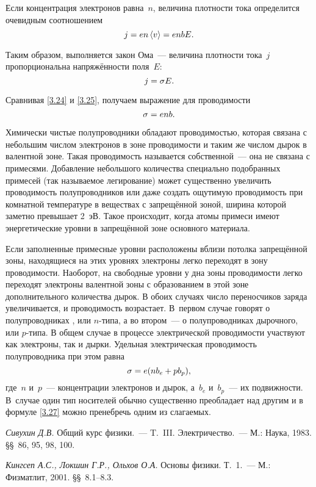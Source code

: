 Если концентрация электронов равна~$n$, величина плотности тока определится
очевидным соотношением
\begin{equation}
	\eqmark{3.24}
	j=en\average{v}=enbE.
\end{equation}

Таким образом, выполняется закон Ома~--- величина плотности тока~$j$
пропорциональна напряжённости поля~$E$:
\begin{equation}
	\eqmark{3.25}
	j=\sigma E.
\end{equation}

Сравнивая \eqref{3.24} и \eqref{3.25}, получаем выражение для проводимости
\begin{equation}
	\eqmark{3.26}
	\sigma=enb.
\end{equation}

Химически чистые полупроводники обладают проводимостью, которая связана с
небольшим числом электронов в зоне
проводимости и таким же числом дырок в валентной зоне. Такая проводимость
называется собственной~--- она не связана с примесями. Добавление небольшого
количества специально подобранных примесей (так называемое
легирование) может существенно увеличить проводимость полупроводников или даже
создать ощутимую проводимость при комнатной температуре в веществах с
запрещённой зоной, ширина которой заметно превышает 2~эВ. Такое происходит,
когда атомы примеси имеют энергетические уровни в запрещённой зоне основного
материала.

Если заполненные примесные уровни расположены вблизи потолка запрещённой зоны,
находящиеся на этих уровнях электроны легко переходят в зону проводимости.
Наоборот, на свободные уровни у дна зоны проводимости легко переходят электроны
валентной зоны с образованием в этой зоне дополнительного количества дырок. В
обоих случаях число переносчиков заряда увеличивается, и проводимость
возрастает. В~первом случае говорят о полупроводниках ,
или $n$-типа, а во втором~--- о  полупроводниках дырочного, или $p$-типа. В
общем случае в процессе электрической проводимости участвуют как электроны, так
и дырки. Удельная электрическая проводимость полупроводника при этом равна
\begin{equation}
	\eqmark{3.27}
	\sigma=e(nb_e+pb_p),
\end{equation}
где~$n$ и~$p$~--- концентрации электронов и дырок, а~$b_e$ и~$b_p$~--- их
подвижности. В~случае  один тип носителей обычно существенно преобладает над другим и в
формуле \eqref{3.27} можно пренебречь одним из слагаемых.



\begin{lab:literature}
	\item{ \emph{Сивухин Д.В.} Общий курс физики.~--- T.~III. Электричество.~---
М.: Наука, 1983. \S\S~86, 95, 98, 100.}
	\item{ \emph{Кингсеп А.С., Локшин Г.Р., Ольхов О.А.} Основы физики.
Т.~1.~--- М.: Физматлит, 2001. \S\S~8.1--8.3.}
\end{lab:literature}


